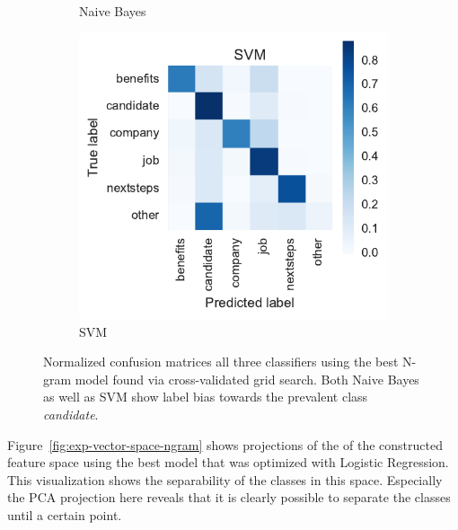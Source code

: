 \begin{figure}[h]
\begin{subfigure}[b]{0.32\textwidth}
        \caption{Naive Bayes}
\label{fig:exp-vector-space-conf-matrix-ngram-naivebayes-normalized}
    \end{subfigure}
    \begin{subfigure}[b]{0.32\textwidth}
        \includegraphics[width=\textwidth]{img/exp-vector-space-conf-matrix-ngram-svm-normalized.pdf}
        \caption{SVM}
\label{fig:exp-vector-space-conf-matrix-ngram-svm-normalized}
    \end{subfigure}
    \caption{Normalized confusion matrices all three classifiers using the best N-gram model found via cross-validated grid search. Both Naive Bayes as well as SVM show label bias towards the prevalent class \emph{candidate}.}
\label{fig:exp-vector-space-conf-matrix-ngram}
\end{figure}

Figure~\ref{fig:exp-vector-space-ngram} shows projections of the of the constructed feature space using the best model that was optimized with Logistic Regression. This visualization shows the separability of the classes in this space. Especially the PCA projection here reveals that it is clearly possible to separate the classes until a certain point.

